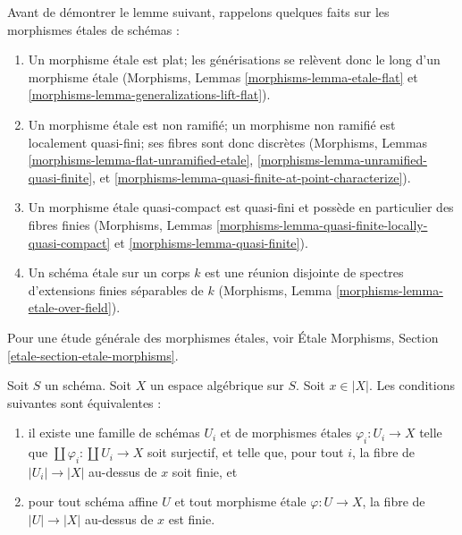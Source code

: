 \begin{remark}
\label{remark-recall}
Avant de démontrer le lemme suivant, rappelons quelques faits sur les
morphismes étales de schémas :
\begin{enumerate}
\item Un morphisme étale est plat; les générisations se relèvent donc le long
d'un morphisme étale
(Morphisms, Lemmas \ref{morphisms-lemma-etale-flat}
et \ref{morphisms-lemma-generalizations-lift-flat}).
\item Un morphisme étale est non ramifié; un morphisme non ramifié est
localement quasi-fini; ses fibres sont donc discrètes
(Morphisms, Lemmas \ref{morphisms-lemma-flat-unramified-etale},
\ref{morphisms-lemma-unramified-quasi-finite}, et
\ref{morphisms-lemma-quasi-finite-at-point-characterize}).
\item Un morphisme étale quasi-compact est quasi-fini et possède en particulier
des fibres finies
(Morphisms, Lemmas \ref{morphisms-lemma-quasi-finite-locally-quasi-compact} et
\ref{morphisms-lemma-quasi-finite}).
\item Un schéma étale sur un corps $k$ est une réunion disjointe de spectres
d'extensions finies séparables de $k$
(Morphisms, Lemma \ref{morphisms-lemma-etale-over-field}).
\end{enumerate}
Pour une étude générale des morphismes étales, voir
\'Etale Morphisms, Section \ref{etale-section-etale-morphisms}.
\end{remark}

\begin{lemma}
\label{lemma-U-finite-above-x}
Soit $S$ un schéma. Soit $X$ un espace algébrique sur $S$.
Soit $x \in |X|$. Les conditions suivantes sont équivalentes :
\begin{enumerate}
\item il existe une famille de schémas $U_i$ et de morphismes étales
$\varphi_i : U_i \to X$ telle que
$\coprod \varphi_i : \coprod U_i \to X$ soit surjectif,
et telle que, pour tout $i$, la fibre de
$|U_i| \to |X|$ au-dessus de $x$ soit finie, et
\item pour tout schéma affine $U$ et tout morphisme étale $\varphi : U \to X$,
la fibre de $|U| \to |X|$ au-dessus de $x$ est finie.
\end{enumerate}
\end{lemma}

